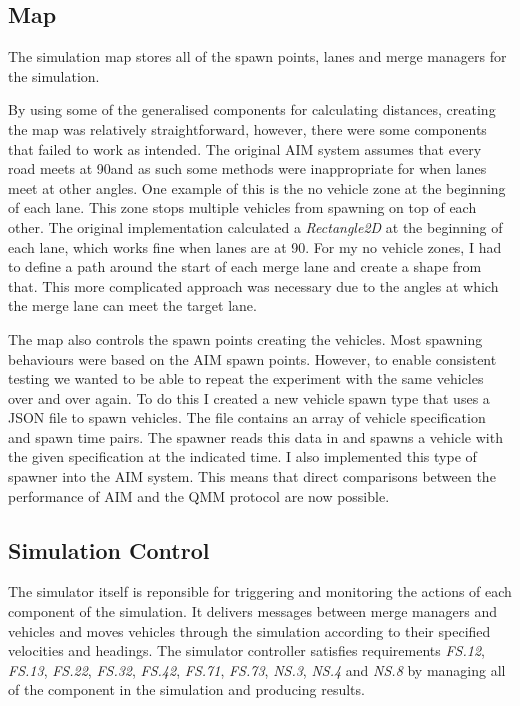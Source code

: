 \subsection{Map}
\label{subsec:Map}
The simulation map stores all of the spawn points, lanes and merge managers for the simulation.

By using some of the generalised components for calculating distances, creating the map was relatively straightforward, however, there were some components that failed to work as intended. The original AIM system assumes that every road meets at 90\degree and as such some methods were inappropriate for when lanes meet at other angles. One example of this is the no vehicle zone at the beginning of each lane. This zone stops multiple vehicles from spawning on top of each other. The original implementation calculated a \emph{Rectangle2D} at the beginning of each lane, which works fine when lanes are at 90\degree. For my no vehicle zones, I had to define a path around the start of each merge lane and create a shape from that. This more complicated approach was necessary due to the angles at which the merge lane can meet the target lane. 

The map also controls the spawn points creating the vehicles. Most spawning behaviours were based on the AIM spawn points. However, to enable consistent testing we wanted to be able to repeat the experiment with the same vehicles over and over again. To do this I created a new vehicle spawn type that uses a JSON file to spawn vehicles. The file contains an array of vehicle specification and spawn time pairs. The spawner reads this data in and spawns a vehicle with the given specification at the indicated time. I also implemented this type of spawner into the AIM system. This means that direct comparisons between the performance of AIM and the QMM protocol are now possible.

\subsection{Simulation Control}
\label{subsec:Simulation Control}
The simulator itself is reponsible for triggering and monitoring the actions of each component of the simulation. It delivers messages between merge managers and vehicles and moves vehicles through the simulation according to their specified velocities and headings. The simulator controller satisfies requirements \emph{FS.12}, \emph{FS.13}, \emph{FS.22}, \emph{FS.32}, \emph{FS.42}, \emph{FS.71}, \emph{FS.73}, \emph{NS.3}, \emph{NS.4} and \emph{NS.8} by managing all of the component in the simulation and producing results.

